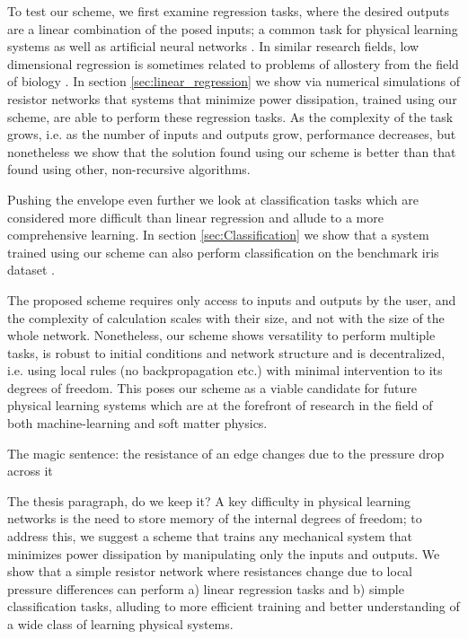 \documentclass[%
 reprint,
 amsmath,amssymb,
 aps,
]{revtex4-2}
\begin{document}
    To test our scheme, we first examine regression tasks, where the desired outputs are a linear combination of the posed inputs; a common task for physical learning systems \cite{altman2024experimental, dillavou2022demonstration} as well as artificial neural networks \cite{bishop2006pattern, tibshirani1996regression}. In similar research fields, low dimensional regression is sometimes related to problems of allostery from the field of biology \cite{rocks2017designing, stern2021supervised, ribeiro2016chemical}. 
    In section \ref{sec:linear_regression} we show via numerical simulations of resistor networks that systems that minimize power dissipation, trained using our scheme, are able to perform these regression tasks. As the complexity of the task grows, i.e. as the number of inputs and outputs grow, performance decreases, but nonetheless we show that the solution found using our scheme is better than that found using other, non-recursive algorithms.
    
    Pushing the envelope even further we look at classification tasks \cite{lecun2015deep, wright2022deep} which are considered more difficult than linear regression and allude to a more comprehensive learning. In section \ref{sec:Classification} we show that a system trained using our scheme can also perform classification on the benchmark iris dataset \cite{fisher1936use}.

    The proposed scheme requires only access to inputs and outputs by the user, and the complexity of calculation scales with their size, and not with the size of the whole network. Nonetheless, our scheme shows versatility to perform multiple tasks, is robust to initial conditions and network structure and is decentralized, i.e. using local rules (no backpropagation etc.) with minimal intervention to its degrees of freedom. This poses our scheme as a viable candidate for future physical learning systems which are at the forefront of research in the field of both machine-learning and soft matter physics.

    \textcolor{roie}{The magic sentence: the resistance of an edge changes due to the pressure drop across it}
    
    \textcolor{roie}{The thesis paragraph, do we keep it? A key difficulty in physical learning networks is the need to store memory of the internal degrees of freedom; to address this, we suggest a scheme that trains any mechanical system that minimizes power dissipation by manipulating only the inputs and outputs. We show that a simple resistor network where resistances change due to local pressure differences can perform a) linear regression tasks and b) simple classification tasks, alluding to more efficient training and better understanding of a wide class of learning physical systems.}
\end{document}
